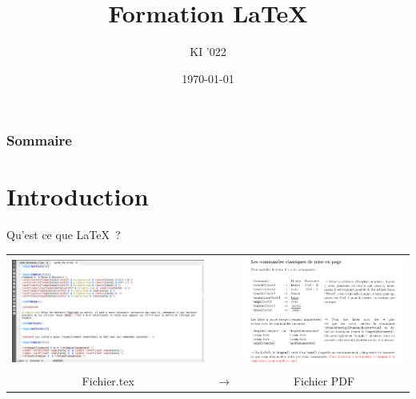 \documentclass[handout]{beamer}
\title{Formation \LaTeX}
\author{KI '022}
\institute{\color{white}Ecole des Ponts Paristech}
\date{\today}
\begin{document}
	\begin{frame}
		\titlepage
	\end{frame}

	\begin{frame}
		\frametitle{Sommaire}
		\setcounter{tocdepth}{1}
		\tableofcontents
	\end{frame}
\section{Introduction}

\begin{frame}{Qu'est ce que \LaTeX \ ?}
	\hspace*{-1cm}
	\begin{tabular}{c c c}
		 \includegraphics[scale=0.13]{ressources/latex_raw.png} & & \includegraphics[scale=0.15]{ressources/latex_output.png}\\
		  Fichier.tex & $\longrightarrow$ &  Fichier PDF
	\end{tabular}
\end{frame}
\end{document}
